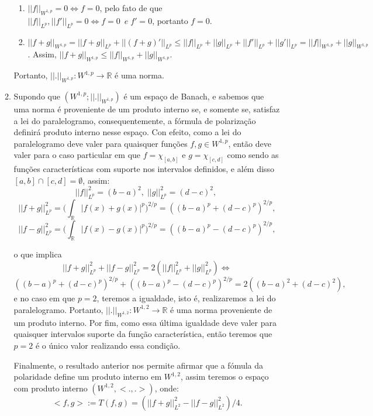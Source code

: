 \documentclass{article}
\begin{document}
\begin{enumerate}
\begin{enumerate}
\begin{enumerate}
					\item $||f||_{W^{1,p}} = 0 \iff f = 0$, pelo fato de que $||f||_{L^{p}}, ||f'||_{L^{p}} = 0 \iff f=0 \;\ e \; f'=0$, portanto $f=0$.
					
					\item $||f + g||_{W^{1,p}} =  ||f+g||_{L^{p}} + ||(f + g)'||_{L^{p}} \leq ||f||_{L^{p}}+||g||_{L^{p}}+||f'||_{L^{p}}+||g'||_{L^{p}} = ||f ||_{W^{1,p}}+|| g||_{W^{1,p}}$. Assim, $||f + g||_{W^{1,p}} \leq ||f ||_{W^{1,p}}+|| g||_{W^{1,p}}$.
					
				\end{enumerate}
				Portanto, $||. ||_{W^{1,p}}: W^{1,p} \to \mathbb{R}$ é uma norma.
				
				\item Supondo que $(W^{1,p};||. ||_{W^{1,p}})$ é um espaço de Banach, e sabemos que uma norma é proveniente de um produto interno se, e somente se, satisfaz a lei do paralelogramo, consequentemente, a fórmula de polarização definirá produto interno nesse espaço. Con efeito, como a lei do paralelogramo deve valer para quaisquer funções $f, g \in W^{1,p}$, então deve valer para o caso particular em que $f = \chi_{[a,b]}$ e $g = \chi_{[c,d]}$ como sendo as funções características com suporte nos intervalos definidos, e além disso $[a,b] \cap [c,d] = \emptyset$, assim: 
				$$
				||f||_{L^{p}}^{2} = (b-a)^{2}, \; 				||g||_{L^{p}}^{2} = (d-c)^{2}, \; 
				$$
				$$
				||f +g||_{L^{p}}^{2} = \Big (\int_{\mathbb{R}}|f(x)+g(x)|^{p} \Big)^{2/p} =((b-a)^{p}+(d-c)^{p})^{2/p},
				$$
				$$
				||f -g||_{L^{p}}^{2} = \Big (\int_{\mathbb{R}}|f(x)-g(x)|^{p} \Big)^{2/p} =((b-a)^{p}-(d-c)^{p})^{2/p},
				$$
				
				o que implica
				$$
				||f +g||_{L^{p}}^{2}+||f -g||_{L^{p}}^{2} =2(||f||_{L^{p}}^{2}+||g||_{L^{p}}^{2}) \iff
				$$
				$$
				((b-a)^{p}+(d-c)^{p})^{2/p}+((b-a)^{p}-(d-c)^{p})^{2/p} = 2((b-a)^{2}+(d-c)^{2}),
				$$
				e no caso em que $p=2$, teremos a igualdade, isto é, realizaremos a lei do paralelogramo. Portanto, $||. ||_{W^{1,2}} : W^{1,2} \to \mathbb{R}$ é uma norma proveniente de um produto interno. Por fim, como essa última igualdade deve valer para quaisquer intervalos suporte da função característica, então teremos que $p=2$ é o único valor realizando essa condição.
				
				Finalmente, o resultado anterior nos permite afirmar que a fómula da polaridade define um produto interno em $W^{1,2}$, assim teremos o espaço com produto interno $(W^{1,2}, <.,.>)$, onde:
				$$
				<f,g> := T(f,g) = (||f +g||_{L^{2}}^{2} - ||f -g||_{L^{2}}^{2})/4.
				$$
			\end{enumerate}
		

\end{enumerate}
\end{document}
